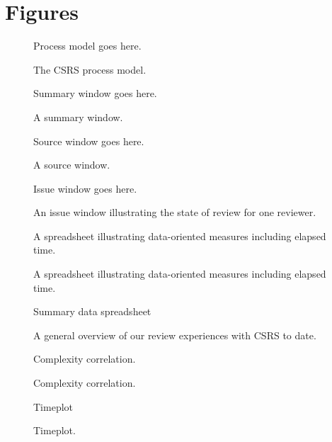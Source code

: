 \section{Figures}
  
\begin{figure}[h]
Process model goes here.
\caption{The CSRS process model.}
\label{fig:process-model}
\end{figure}


\begin{figure}                                        
Summary window goes here.
\caption{A summary window.}
\label{fig:summary}
\end{figure}


\begin{figure}                                        
Source window goes here.
\caption{A source window.}
\label{fig:source}
\end{figure}


\begin{figure}                                        
Issue window goes here.
\caption{An issue window illustrating the state of review for one reviewer.}  
\label{fig:issue}
\end{figure}

\begin{figure}                                        
A spreadsheet illustrating data-oriented measures including elapsed time.
\caption{A spreadsheet illustrating data-oriented measures including elapsed time.}
\label{fig:elapsed-time}
\end{figure}


\begin{figure}                                        
Summary data spreadsheet
\caption{A general overview of our review experiences with CSRS to date.}
\label{fig:review-summary-data}
\end{figure}

\begin{figure}                                        
Complexity correlation.
\caption{Complexity correlation.}
\label{fig:review-complexity-correlation}
\end{figure}

\begin{figure}                                        
Timeplot
\caption{Timeplot.}
\label{fig:timeplot}
\end{figure}






